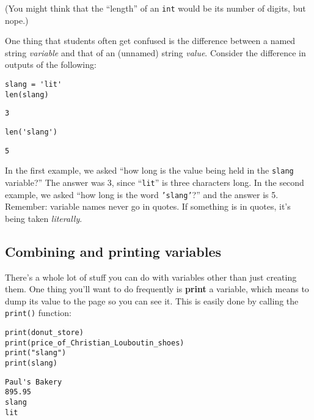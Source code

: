 (You might think that the ``length'' of an \texttt{int} would be its number of
digits, but nope.)

One thing that students often get confused is the difference between a named
string \textit{variable} and that of an (unnamed) string \textit{value}.
Consider the difference in outputs of the following:

\begin{Verbatim}[fontsize=\small,samepage=true,frame=single,framesep=3mm]
slang = 'lit'
len(slang)
\end{Verbatim}
\begin{Verbatim}[fontsize=\small,samepage=true,frame=leftline,framesep=5mm,framerule=1mm]
3
\end{Verbatim}
\begin{Verbatim}[fontsize=\small,samepage=true,frame=single,framesep=3mm]
len('slang')
\end{Verbatim}
\begin{Verbatim}[fontsize=\small,samepage=true,frame=leftline,framesep=5mm,framerule=1mm]
5
\end{Verbatim}

In the first example, we asked ``how long is the value being held in the
\texttt{slang} variable?'' The answer was 3, since ``\texttt{lit}'' is three
characters long. In the second example, we asked ``how long is the word
\texttt{'slang'}?'' and the answer is 5. Remember: variable names never go in
quotes. If something is in quotes, it's being taken \textit{literally}.


\subsection{Combining and printing variables}

There's a whole lot of stuff you can do with variables other than just creating
them. One thing you'll want to do frequently is \textbf{print} a variable,
which means to dump its value to the page so you can see it. This is easily
done by calling the \texttt{print()} function:

\begin{Verbatim}[fontsize=\small,samepage=true,frame=single,framesep=3mm]
print(donut_store)
print(price_of_Christian_Louboutin_shoes)
print("slang")
print(slang)
\end{Verbatim}

\begin{Verbatim}[fontsize=\small,samepage=true,frame=leftline,framesep=5mm,framerule=1mm]
Paul's Bakery
895.95
slang
lit
\end{Verbatim}

